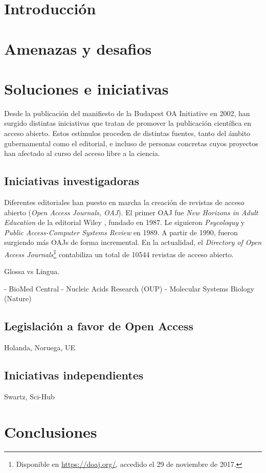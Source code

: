 \section{Introducción}
\section{Amenazas y desafios}
\section{Soluciones e iniciativas}

Desde la publicación del manifiesto de la Budapest OA Initiative \cite{boai} en 2002, han surgido distintas iniciativas que tratan de promover la publicación científica en acceso abierto. Estos estímulos proceden de distintas fuentes, tanto del ámbito gubernamental como el editorial, e incluso de personas concretas cuyos proyectos han afectado al curso del acceso libre a la ciencia.

\subsection{Iniciativas investigadoras}

Diferentes editoriales han puesto en marcha la creación de revistas de acceso abierto (\textit{Open Access Journals, OAJ}). El primer OAJ fue \textit{New Horizons in Adult Education} de la editorial Wiley \cite{earlyoaj}, fundado en 1987. Le siguieron \textit{Psycoloquy} y \textit{Public Access-Computer Systems Review} en 1989. A partir de 1990, fueron surgiendo más OAJs de forma incremental. En la actualidad, el \textit{Directory of Open Access Journals}\footnote{Disponible en \url{https://doaj.org/}, accedido el 29 de noviembre de 2017.} contabiliza un total de 10544 revistas de acceso abierto.

Glossa vs Lingua.

- BioMed Central
- Nucleic Acids Research (OUP)
- Molecular Systems Biology (Nature)

\subsection{Legislación a favor de Open Access}

Holanda, Noruega, UE \cite{enserink2016dramatic}

\subsection{Iniciativas independientes}

Swartz, Sci-Hub

\section{Conclusiones}
